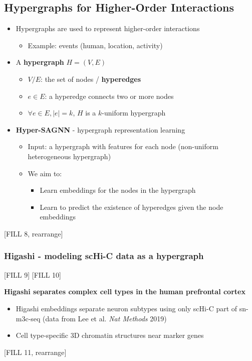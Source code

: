 \documentclass[10pt]{article}
\begin{document}
\subsection*{Hypergraphs for Higher-Order Interactions}
\begin{itemize}
	\item Hypergraphs are used to represent higher-order interactions
	\begin{itemize}
	    \item Example: events (human, location, activity)
    \end{itemize}
    \item A \textbf{hypergraph} $H = (V, E)$
    \begin{itemize}
	    \item $V / E$: the set of nodes / \textbf{hyperedges}
	    \item $e \in E$: a hyperedge connects two or more nodes
	    \item $\forall e \in E, |e| = k$, $H$ is a $k$-uniform hypergraph
    \end{itemize}
    \item \textbf{Hyper-SAGNN} - hypergraph representation learning
    \begin{itemize}
	    \item Input: a hypergraph with features for each node (non-uniform heterogeneous hypergraph)
        \item We aim to:
        \begin{itemize}
	        \item Learn embeddings for the nodes in the hypergraph
	        \item Learn to predict the existence of hyperedges given the node embeddings
        \end{itemize}
    \end{itemize}
\end{itemize}
[FILL 8, rearrange]

\subsubsection*{Higashi - modeling scHi-C data as a hypergraph}
[FILL 9]
[FILL 10]

\textbf{Higashi separates complex cell types in the human prefrontal cortex}
\begin{itemize}
	\item Higashi embeddings separate neuron subtypes using only scHi-C part of sn-m3c-seq (data from Lee et al. \textit{Nat Methods} 2019)
	\item Cell type-specific 3D chromatin structures near marker genes
\end{itemize}
[FILL 11, rearrange]
\end{document}
